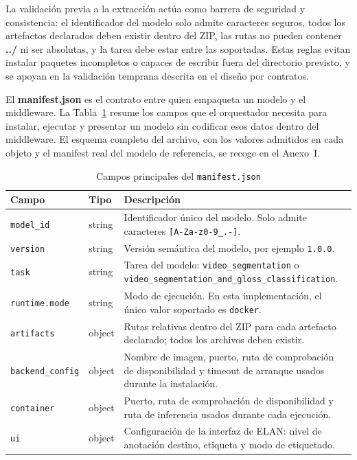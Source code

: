 \documentclass[11pt,a4paper]{article}
\begin{document}
La validación previa a la extracción actúa como barrera de seguridad y consistencia: el identificador del modelo solo admite caracteres seguros, todos los artefactos declarados deben existir dentro del ZIP, las rutas no pueden contener \textbf{../} ni ser absolutas, y la tarea debe estar entre las soportadas. Estas reglas evitan instalar paquetes incompletos o capaces de escribir fuera del directorio previsto, y se apoyan en la validación temprana descrita en el diseño por contratos.

El \textbf{manifest.json} es el contrato entre quien empaqueta un modelo y el middleware. La Tabla~\ref{tab:manifest_campos} resume los campos que el orquestador necesita para instalar, ejecutar y presentar un modelo sin codificar esos datos dentro del middleware. El esquema completo del archivo, con los valores admitidos en cada objeto y el manifest real del modelo de referencia, se recoge en el Anexo~I.

\begin{table}[H]
\centering
\caption{Campos principales del \texttt{manifest.json}}
\label{tab:manifest_campos}
\small
\renewcommand{\arraystretch}{1.15}
\begin{tabular}{@{}>{\raggedright\arraybackslash}p{3.1cm}>{\raggedright\arraybackslash}p{2.1cm}>{\raggedright\arraybackslash}p{7.2cm}@{}}
\toprule
\textbf{Campo} & \textbf{Tipo} & \textbf{Descripción} \\
\midrule
\texttt{model\_id} & string & Identificador único del modelo. Solo admite caracteres \texttt{[A-Za-z0-9\_.-]}. \\
\texttt{version} & string & Versión semántica del modelo, por ejemplo \texttt{1.0.0}. \\
\texttt{task} & string & Tarea del modelo: \texttt{video\_segmentation} o \newline\texttt{video\_segmentation\_and}\newline\texttt{\_gloss\_classification}. \\
\texttt{runtime.mode} & string & Modo de ejecución. En esta implementación, el único valor soportado es \texttt{docker}. \\
\texttt{artifacts} & object & Rutas relativas dentro del ZIP para cada artefacto declarado; todos los archivos deben existir. \\
\texttt{backend\_config} & object & Nombre de imagen, puerto, ruta de comprobación de disponibilidad y timeout de arranque usados durante la instalación. \\
\texttt{container} & object & Puerto, ruta de comprobación de disponibilidad y ruta de inferencia usados durante cada ejecución. \\
\texttt{ui} & object & Configuración de la interfaz de ELAN: nivel de anotación destino, etiqueta y modo de etiquetado. \\
\bottomrule
\end{tabular}
\end{table}
\end{document}
